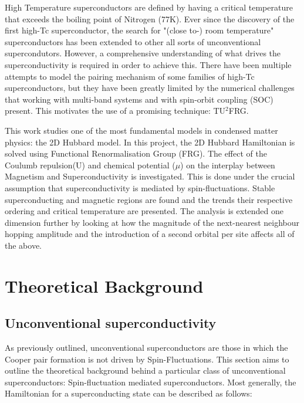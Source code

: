 \documentclass[12pt]{article}
\begin{document}
\noindent High Temperature superconductors are defined by having a critical temperature that exceeds the boiling point 
of Nitrogen (77K). Ever since the discovery of the first high-Tc superconductor, the search for "(close to-) room temperature" superconductors has been extended to 
other all sorts of unconventional supercondutors. However, a comprehensive understanding of what drives the superconductivity is required in order 
to achieve this. There have been multiple attempts to model the pairing mechanism of some families of high-Tc superconductors, but they have
been greatly limited by the numerical challenges that working with multi-band systems and with spin-orbit coupling (SOC) present. 
This motivates the use of a promising technique: TU$^2$FRG\cite{eckhardt2020truncated,profe2024magic}.\par

\medskip

\noindent This work studies one of the most fundamental models in condensed matter physics: the 2D Hubbard model. 
In this project, the 2D Hubbard Hamiltonian is solved using Functional Renormalisation Group (FRG). The effect of the Coulumb repulsion(U) and 
chemical potential ($\mu$) on the interplay between Magnetism and Superconductivity is investigated. This is done under the crucial assumption
that superconductivity is mediated by spin-fluctuations. Stable superconducting and
magnetic regions are found and the trends their respective ordering and critical temperature are presented. The analysis is extended one dimension further 
by looking at how the magnitude of the next-nearest neighbour hopping amplitude and the introduction of a second orbital 
per site affects all of the above. 



\section{Theoretical Background}

\subsection{Unconventional superconductivity}

As previously outlined, unconventional superconductors are those in which the Cooper pair formation is not driven by Spin-Fluctuations. 
This section aims to outline the theoretical background behind a particular class of unconventional superconductors: Spin-fluctuation mediated superconductors. 
\medskip
\noindent Most generally, the Hamiltonian for a superconducting state can be described as follows:
\end{document}

